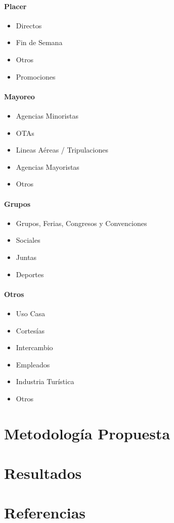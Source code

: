\documentclass[a4paper,11pt]{article}
\begin{document}
\paragraph{\textbf{Placer}}
\begin{itemize}[noitemsep]
\item Directos
\item Fin de Semana
\item Otros
\item Promociones
\end{itemize}
\paragraph{\textbf{Mayoreo}}
\begin{itemize}[noitemsep]
\item Agencias Minoristas
\item OTAs
\item Lineas Aéreas / Tripulaciones
\item Agencias Mayoristas
\item Otros
\end{itemize}
\paragraph{\textbf{Grupos}}
\begin{itemize}[noitemsep]
\item Grupos, Ferias, Congresos y Convenciones
\item Sociales
\item Juntas
\item Deportes
\end{itemize}
\paragraph{\textbf{Otros}}
\begin{itemize}[noitemsep]
\item Uso Casa
\item Cortesías
\item Intercambio
\item Empleados
\item Industria Turística
\item Otros
\end{itemize}
\section{Metodología Propuesta}
\section{Resultados}
\section{Referencias}
\end{document}
